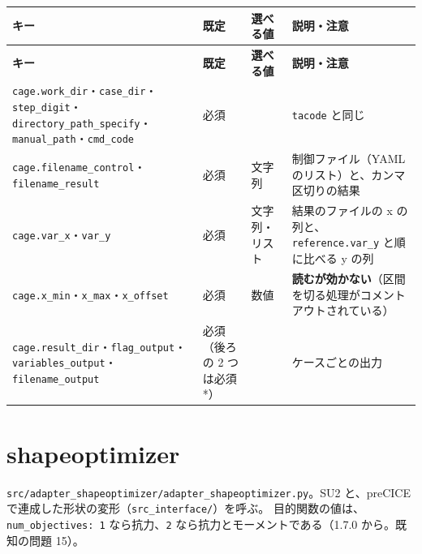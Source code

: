 \begingroup\small
\begin{longtable}{>{\raggedright\arraybackslash}p{}>{\raggedright\arraybackslash}p{}>{\raggedright\arraybackslash}p{}>{\raggedright\arraybackslash}p{}}
\toprule
\textbf{キー} & \textbf{既定} & \textbf{選べる値} & \textbf{説明・注意} \\
\midrule
\endfirsthead
\toprule
\textbf{キー} & \textbf{既定} & \textbf{選べる値} & \textbf{説明・注意} \\
\midrule
\endhead
\bottomrule
\endlastfoot
\texttt{cage.\allowbreak{}work\_\allowbreak{}dir}・\texttt{case\_\allowbreak{}dir}・\texttt{step\_\allowbreak{}digit}・\texttt{directory\_\allowbreak{}path\_\allowbreak{}specify}・\texttt{manual\_\allowbreak{}path}・\texttt{cmd\_\allowbreak{}code} & 必須 &  & \texttt{tacode} と同じ \\
\texttt{cage.\allowbreak{}filename\_\allowbreak{}control}・\texttt{filename\_\allowbreak{}result} & 必須 & 文字列 & 制御ファイル（YAML のリスト）と、カンマ区切りの結果 \\
\texttt{cage.\allowbreak{}var\_\allowbreak{}x}・\texttt{var\_\allowbreak{}y} & 必須 & 文字列・リスト & 結果のファイルの x の列と、\texttt{reference.\allowbreak{}var\_\allowbreak{}y} と順に比べる y の列 \\
\texttt{cage.\allowbreak{}x\_\allowbreak{}min}・\texttt{x\_\allowbreak{}max}・\texttt{x\_\allowbreak{}offset} & 必須 & 数値 & \textbf{読むが効かない}（区間を切る処理がコメントアウトされている） \\
\texttt{cage.\allowbreak{}result\_\allowbreak{}dir}・\texttt{flag\_\allowbreak{}output}・\texttt{variables\_\allowbreak{}output}・\texttt{filename\_\allowbreak{}output} & 必須（後ろの 2 つは必須*） &  & ケースごとの出力 \\
\end{longtable}
\endgroup

\section{shapeoptimizer}

\texttt{src/\allowbreak{}adapter\_\allowbreak{}shapeoptimizer/\allowbreak{}adapter\_\allowbreak{}shapeoptimizer.\allowbreak{}py}。SU2 と、preCICE で連成した形状の変形（\texttt{src\_\allowbreak{}interface/\allowbreak{}}）を呼ぶ。
目的関数の値は、\texttt{num\_\allowbreak{}objectives: 1} なら抗力、\texttt{2} なら抗力とモーメントである（1.7.0 から。既知の問題 15）。

